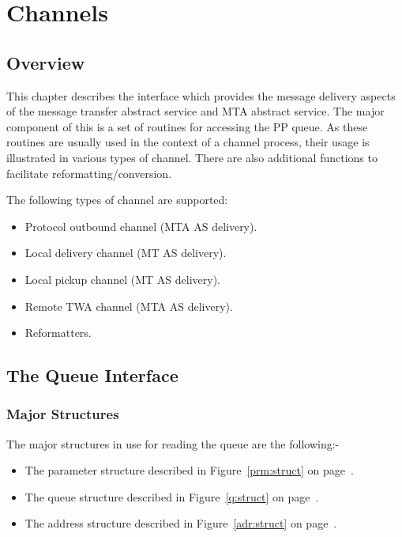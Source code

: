 \chapter {Channels}

\section {Overview}

This chapter describes the interface which provides the message
delivery aspects of the message transfer abstract service and MTA
abstract service.  The major component of this is a set of routines
for accessing the PP queue.  As these routines are usually used in the
context of a channel process, their usage is illustrated in various
types of channel.  There are also additional functions to facilitate
reformatting/conversion.

The following types of channel are supported:

\begin{itemize}
\item Protocol outbound channel (MTA AS delivery).

\item Local delivery channel (MT AS delivery).

\item Local pickup channel (MT AS delivery).

\item Remote TWA channel (MTA AS delivery).

\item Reformatters.
\end{itemize}

\section {The Queue Interface}

\subsection {Major Structures}

The major structures in use for reading the queue are the following:-
\begin{itemize}
\item The parameter structure described in Figure~\ref{prm:struct} on
page~\pageref{prm:struct}.

\item The queue structure described in Figure~\ref{q:struct} on
page~\pageref{q:struct}.

\item The address structure described in Figure~\ref{adr:struct} on
page~\pageref{adr:struct}.

\end{itemize}

